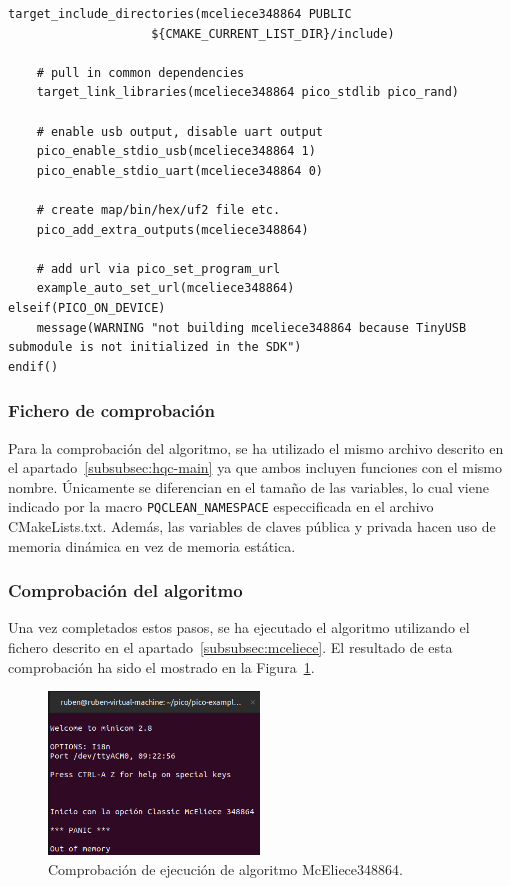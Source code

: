 \begin{lstlisting}[label={lst:mceliece-make},style=Cnice,firstnumber=1,caption={Archivo \texttt{McEliece348864/CMakeLists.txt}.}]
    target_include_directories(mceliece348864 PUBLIC
                    ${CMAKE_CURRENT_LIST_DIR}/include)

    # pull in common dependencies
    target_link_libraries(mceliece348864 pico_stdlib pico_rand)

    # enable usb output, disable uart output
    pico_enable_stdio_usb(mceliece348864 1)
    pico_enable_stdio_uart(mceliece348864 0)

    # create map/bin/hex/uf2 file etc.
    pico_add_extra_outputs(mceliece348864)

    # add url via pico_set_program_url
    example_auto_set_url(mceliece348864)
elseif(PICO_ON_DEVICE)
    message(WARNING "not building mceliece348864 because TinyUSB submodule is not initialized in the SDK")
endif()
\end{lstlisting}


\subsubsection{Fichero de comprobación}\label{subsubsec:mceliece-main}

Para la comprobación del algoritmo, se ha utilizado el mismo archivo descrito en el apartado~\ref{subsubsec:hqc-main} ya que ambos incluyen funciones con el mismo nombre.
Únicamente se diferencian en el tamaño de las variables, lo cual viene indicado por la macro \texttt{PQCLEAN\_NAMESPACE} especcificada en el archivo CMakeLists.txt.
Además, las variables de claves pública y privada hacen uso de memoria dinámica en vez de memoria estática.


\subsubsection{Comprobación del algoritmo}\label{subsubsec:mceliece-comp}

Una vez completados estos pasos, se ha ejecutado el algoritmo utilizando el fichero descrito en el apartado~\ref{subsubsec:mceliece}.
El resultado de esta comprobación ha sido el mostrado en la Figura~\ref{fig:mceliece-check}.

\begin{figure}[h]
    \centering
    \includegraphics[width=0.5\textwidth]{figures/mceliece-check.png}
    \caption{Comprobación de ejecución de algoritmo McEliece348864.}
    \label{fig:mceliece-check}
\end{figure}

